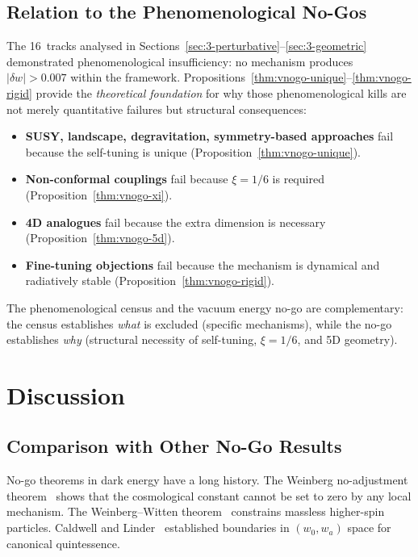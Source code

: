 \subsection{Relation to the Phenomenological No-Gos}
\label{sec:3-vnogo-relation}

The 16~tracks analysed in Sections~\ref{sec:3-perturbative}--\ref{sec:3-geometric} demonstrated phenomenological insufficiency: no mechanism produces $|\delta w| > 0.007$ within the framework. Propositions~\ref{thm:vnogo-unique}--\ref{thm:vnogo-rigid} provide the \emph{theoretical foundation} for why those phenomenological kills are not merely quantitative failures but structural consequences:

\begin{itemize}
  \item \textbf{SUSY, landscape, degravitation, symmetry-based approaches} fail because the self-tuning is unique (Proposition~\ref{thm:vnogo-unique}).
  \item \textbf{Non-conformal couplings} fail because $\xi = 1/6$ is required (Proposition~\ref{thm:vnogo-xi}).
  \item \textbf{4D analogues} fail because the extra dimension is necessary (Proposition~\ref{thm:vnogo-5d}).
  \item \textbf{Fine-tuning objections} fail because the mechanism is dynamical and radiatively stable (Proposition~\ref{thm:vnogo-rigid}).
\end{itemize}

The phenomenological census and the vacuum energy no-go are complementary: the census establishes \emph{what} is excluded (specific mechanisms), while the no-go establishes \emph{why} (structural necessity of self-tuning, $\xi = 1/6$, and 5D geometry).

\section{Discussion}
\label{sec:3-discussion}

\subsection{Comparison with Other No-Go Results}
\label{sec:3-othernogo}

No-go theorems in dark energy have a long history. The Weinberg no-adjustment theorem~\cite{ch3:weinberg1989} shows that the cosmological constant cannot be set to zero by any local mechanism. The Weinberg--Witten theorem~\cite{ch3:weinbergwitten1980} constrains massless higher-spin particles. Caldwell and Linder~\cite{ch3:caldwell2005} established boundaries in $(w_0, w_a)$ space for canonical quintessence.

